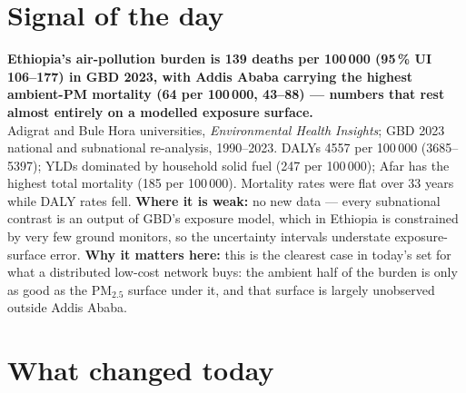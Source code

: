 \documentclass[10pt]{article}
\begin{document}
\vspace{6mm}

\section*{\sffamily\bfseries\color{Deep}Signal of the day}
\vspace{-1.5mm}{\color{Amber}\rule{\linewidth}{1.1pt}}\vspace{2.5mm}

\begin{keybox}
{\sffamily\bfseries\small\color{Deep}Ethiopia's air-pollution burden is 139 deaths per 100\,000 (95\,\% UI 106--177) in GBD 2023, with Addis Ababa carrying the highest ambient-PM mortality (64 per 100\,000, 43--88) --- numbers that rest almost entirely on a modelled exposure surface.}\\[1.4mm]
\footnotesize
Adigrat and Bule Hora universities, \textit{Environmental Health Insights}; GBD 2023 national and subnational re-analysis, 1990--2023. DALYs 4557 per 100\,000 (3685--5397); YLDs dominated by household solid fuel (247 per 100\,000); Afar has the highest total mortality (185 per 100\,000). Mortality rates were flat over 33 years while DALY rates fell.
\textbf{Where it is weak:} no new data --- every subnational contrast is an output of GBD's exposure model, which in Ethiopia is constrained by very few ground monitors, so the uncertainty intervals understate exposure-surface error.
\textbf{Why it matters here:} this is the clearest case in today's set for what a distributed low-cost network buys: the ambient half of the burden is only as good as the PM$_{2.5}$ surface under it, and that surface is largely unobserved outside Addis Ababa.\par
\end{keybox}

\vspace{3mm}

\section*{\sffamily\bfseries\color{Deep}What changed today}
\vspace{-1.5mm}{\color{Amber}\rule{\linewidth}{1.1pt}}\vspace{2.5mm}
\end{document}
